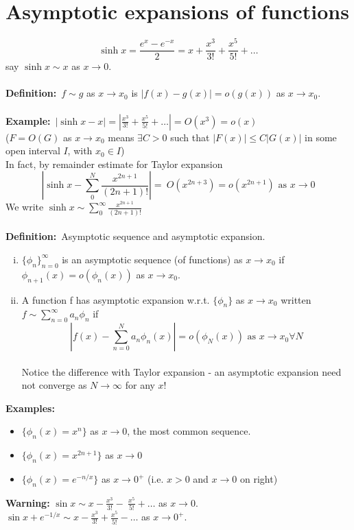 \documentclass{article}
\newcommand{\definition}{\textbf{Definition:}}
\newcommand{\example}{\textbf{Example:}}
\newcommand{\examples}{\textbf{Examples:}}
\begin{document}
\section{Asymptotic expansions of functions}
\[ \sinh x = \frac{e^x - e^{-x}}{2} = x + \frac{x^3}{3!} + \frac{x^5}{5!} + \dots\]
say $\sinh x \sim x$ as $x \to 0$.
\\
\\
\definition\ $f \sim g$ as $x \to x_0$ is $|f(x) - g(x)| = o(g(x))$ as $x \to x_0$.
\\
\\
\example\ $|\sinh x - x| = |\frac{x^3}{3!} + \frac{x^5}{5!} + \dots| = O(x^3) = o(x)$
\\
($F=O(G)$ as $x \to x_0$ means $\exists C>0$ such that $|F(x)| \leq C|G(x)|$ in
some open interval $I$, with $x_0 \in I$)
\\
In fact, by remainder estimate for Taylor expansion
\[ \left| \sinh x - \sum_{0}^{N} \frac{x^{2n+1}}{(2n+1)!} \right| = \
O(x^{2n+3}) = o(x^{2n+1}) \mbox{ as } x \to 0\]
We write $\sinh x \sim \sum_{0}^{\infty} \frac{x^{2n+1}}{(2n+1)!}$
\\
\\
\definition\ Asymptotic sequence and asymptotic expansion.
\begin{enumerate}[(i)]
\item $\{\phi_n\}_{n=0}^{\infty}$ is an asymptotic sequence (of functions) as 
		$x \to x_0$ if $\phi_{n+1}(x) = o(\phi_n(x))$ as $x \to x_0$. 
\item A function f has asymptotic expansion w.r.t. $\{ \phi_n\}$ as $x \to x_0$ 
		written $f \sim \sum_{n=0}^{\infty} a_n \phi_n$ if 
		\[ \left| f(x) - \sum_{n=0}^N a_n \phi_n(x) \right| = o(\phi_N(x)) \mbox{ as }
		 x \to x_0 \forall N\]
		\\
		Notice the difference with Taylor expansion - an asymptotic expansion 
		need not converge as $N\to \infty$ for any $x$!
\end{enumerate}
\examples\ 
\begin{itemize}
\item $\{ \phi_n(x) = x^n \}$ as $x \to 0$, the most common sequence.
\item $\{ \phi_n(x) = x^{2n+1} \}$ as $x \to 0$
\item $\{ \phi_n(x) = e^{-n/x} \}$ as $x \to 0^+$ (i.e. $x>0$ and $x\to 0$ on right)
\end{itemize}
%
%
\begin{framed}
\noindent \textbf{Warning:} $\sin x \sim x - \frac{x^3}{3!} -\
\frac{x^5}{5!} + \dots$ as $x \to 0$.
\\
$\sin x + e^{-1/x} \sim x  - \frac{x^3}{3!} + \frac{x^5}{5!} - \dots$ 
as $x \to 0^{+}$.
\end{framed}
\end{document}
